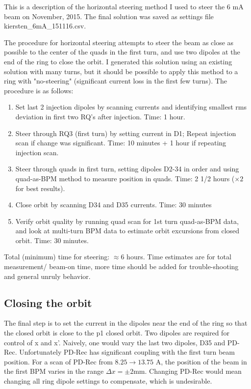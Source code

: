 This is a description of the horizontal steering method I used to steer the 6 mA beam on November, 2015. The final solution was saved as settings file kiersten\_6mA\_151116.csv.

The procedure for horizontal steering attempts to steer the beam as close as possible to the center of the quads in the first turn, and use two dipoles at the end of the ring to close the orbit. I generated this solution using an existing solution with many turns, but it should be possible to apply this method to a ring with "no-steering" (significant current loss in the first few turns).
The procedure is as follows:

\begin{enumerate}
\item Set last 2 injection dipoles by scanning currents and identifying smallest rms deviation in first two RQ's after injection. Time: 1 hour.
\item Steer through RQ3 (first turn) by setting current in D1; Repeat injection scan if change was significant. Time: 10 minutes + 1 hour if repeating injection scan.
\item Steer through quads in first turn, setting dipoles D2-34 in order and using quad-as-BPM method to measure position in quads. Time: 2 1/2 hours ($\times 2$ for best results).
\item Close orbit by scanning D34 and D35 currents.  Time: 30 minutes
\item Verify orbit quality by running quad scan for 1st turn quad-as-BPM data, and look at multi-turn BPM data to estimate orbit excursions from closed orbit. Time: 30 minutes.
\end{enumerate}

 Total (minimum) time for steering: $\approx 6$ hours. Time estimates are for total measurement/ beam-on time, more time should be added for trouble-shooting and general unruly behavior.
 
 
 
 
 
 
 
 
 
 
 
 
\subsection{Closing the orbit}

The final step is to set the current in the dipoles near the end of the ring so that the closed orbit is close to the p1 closed orbit.  Two dipoles are required for control of x and x'. Naively, one would vary the last two dipoles, D35 and PD-Rec. Unfortunately PD-Rec has significant coupling with the first turn beam position. For a scan of PD-Rec from $8.25 \rightarrow 13.75$ A, the position of the beam in the first BPM varies in the range $\Delta x = \pm 2$mm. Changing PD-Rec would mean changing all ring dipole settings to compensate, which is undesirable. 

